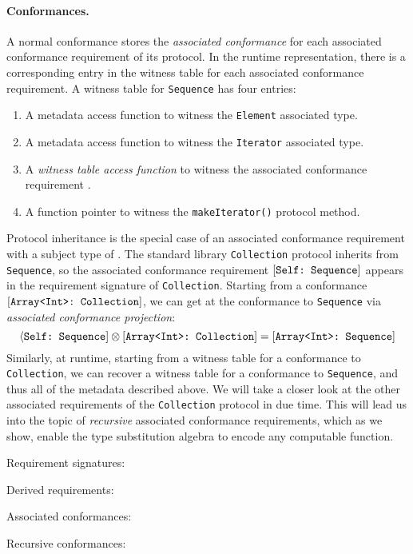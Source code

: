 \documentclass[../generics]{subfiles}
\begin{document}
\paragraph{Conformances.}
A normal conformance stores the \emph{associated conformance} for each associated conformance requirement of its protocol. In the runtime representation, there is a corresponding entry in the witness table for each associated conformance requirement. A witness table for \texttt{Sequence} has four entries:
\begin{enumerate}
\item A metadata access function to witness the \texttt{Element} associated type.
\item A metadata access function to witness the \texttt{Iterator} associated type.
\item A \emph{witness table access function} to witness the associated conformance requirement .
\item A function pointer to witness the \texttt{makeIterator()} protocol method.
\end{enumerate}
Protocol inheritance is the special case of an associated conformance requirement with a subject type of \tSelf. The standard library \texttt{Collection} protocol inherits from \texttt{Sequence}, so the associated conformance requirement $[\texttt{Self:~Sequence}]$ appears in the requirement signature of \texttt{Collection}. Starting from a conformance $[\texttt{Array<Int>:~Collection}]$, we can get at the conformance to \texttt{Sequence} via \emph{associated conformance projection}:
\[\langle\texttt{Self:~Sequence}]\otimes[\texttt{Array<Int>:~Collection}]=[\texttt{Array<Int>:~Sequence}]\]
Similarly, at runtime, starting from a witness table for a conformance to \texttt{Collection}, we can recover a witness table for a conformance to \texttt{Sequence}, and thus all of the metadata described above. We will take a closer look at the other associated requirements of the \texttt{Collection} protocol in due time. This will lead us into the topic of \emph{recursive} associated conformance requirements, which as we show, enable the type substitution algebra to encode any computable function.

\begin{MoreDetails}
\item Requirement signatures: 
\item Derived requirements: 
\item Associated conformances: 
\item Recursive conformances: 
\end{MoreDetails}
\end{document}
